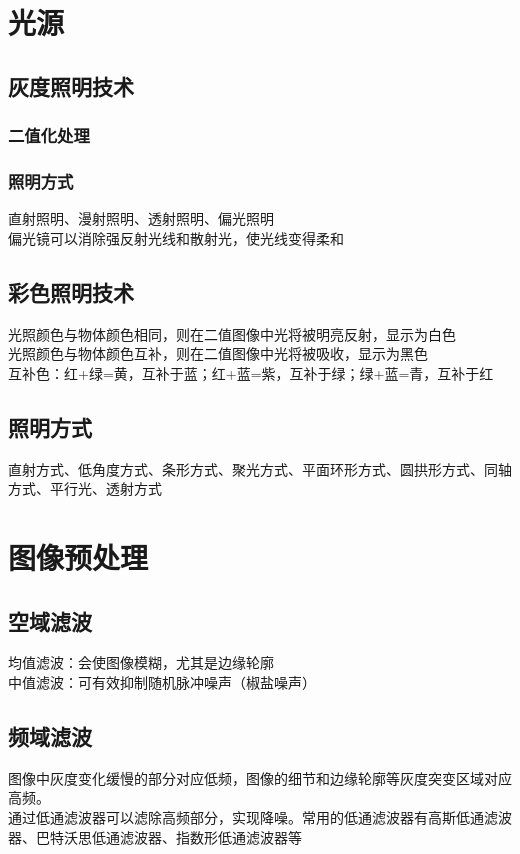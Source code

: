 \documentclass[11pt]{article}
\begin{document}
\section{光源}

\subsection{灰度照明技术}
\subsubsection{二值化处理}
\subsubsection{照明方式}
直射照明、漫射照明、透射照明、偏光照明  \\
偏光镜可以消除强反射光线和散射光，使光线变得柔和

\subsection{彩色照明技术}
光照颜色与物体颜色相同，则在二值图像中光将被明亮反射，显示为白色  \\
光照颜色与物体颜色互补，则在二值图像中光将被吸收，显示为黑色  \\
互补色：红+绿=黄，互补于蓝；红+蓝=紫，互补于绿；绿+蓝=青，互补于红

\subsection{照明方式}
直射方式、低角度方式、条形方式、聚光方式、平面环形方式、圆拱形方式、同轴方式、平行光、透射方式


\section{图像预处理}

\subsection{空域滤波}
均值滤波：会使图像模糊，尤其是边缘轮廓  \\
中值滤波：可有效抑制随机脉冲噪声（椒盐噪声）

\subsection{频域滤波}
图像中灰度变化缓慢的部分对应低频，图像的细节和边缘轮廓等灰度突变区域对应高频。  \\
通过低通滤波器可以滤除高频部分，实现降噪。常用的低通滤波器有高斯低通滤波器、巴特沃思低通滤波器、指数形低通滤波器等
\end{document}
